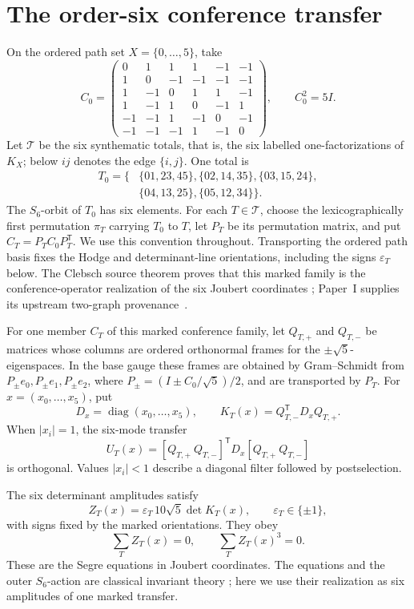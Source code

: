 \documentclass[11pt]{article}
\theoremstyle{remark}
\begin{document}
\section{The order-six conference transfer}

On the ordered path set \(X=\{0,\ldots,5\}\), take
\[
C_0=\begin{pmatrix}
0&1&1&1&-1&-1\\
1&0&-1&-1&-1&-1\\
1&-1&0&1&1&-1\\
1&-1&1&0&-1&1\\
-1&-1&1&-1&0&-1\\
-1&-1&-1&1&-1&0
\end{pmatrix},\qquad C_0^2=5I.
\]
Let \(\mathcal T\) be the six synthematic totals, that is, the six labelled
one-factorizations of \(K_X\); below \(ij\) denotes the edge \(\{i,j\}\).
One total is
\[
\begin{split}
T_0=\{&
\{01,23,45\},\{02,14,35\},\{03,15,24\},\\
&\{04,13,25\},\{05,12,34\}\}.
\end{split}
\]
The \(S_6\)-orbit of \(T_0\) has six elements.  For each
\(T\in\mathcal T\), choose the lexicographically first permutation
\(\pi_T\) carrying \(T_0\) to \(T\), let \(P_T\) be its permutation matrix,
and put \(C_T=P_TC_0P_T^{\mathsf T}\).  We use this convention throughout.
Transporting the ordered path basis fixes the Hodge and
determinant-line orientations, including the signs \(\varepsilon_T\) below.
The Clebsch source theorem proves that this marked family is the
conference-operator realization of the six Joubert coordinates
\cite[Theorem~5.1]{ClebschIII}; Paper~I supplies its upstream
two-graph provenance~\cite{ClebschI}.

For one member \(C_T\) of this marked conference family, let
\(Q_{T,+}\) and \(Q_{T,-}\) be matrices whose columns are ordered orthonormal
frames for the \(\pm\sqrt5\)-eigenspaces.  In the base gauge these frames are
obtained by Gram--Schmidt from
\(P_{\pm}e_0,P_{\pm}e_1,P_{\pm}e_2\), where
\(P_\pm=(I\pm C_0/\sqrt5)/2\), and are transported by \(P_T\).  For
\(x=(x_0,\ldots,x_5)\), put
\[
 D_x=\operatorname{diag}(x_0,\ldots,x_5),\qquad
 K_T(x)=Q_{T,-}^{\mathsf T}D_xQ_{T,+}.
\]
When \(|x_i|=1\), the six-mode transfer
\[
 U_T(x)=
 [Q_{T,+}\ Q_{T,-}]^{\mathsf T}D_x[Q_{T,+}\ Q_{T,-}]
\]
is orthogonal.  Values \(|x_i|<1\) describe a diagonal filter followed by
postselection.

The six determinant amplitudes satisfy
\begin{equation}
\label{eq:conference-amplitude}
 Z_T(x)=\varepsilon_T\,10\sqrt5\det K_T(x),
 \qquad \varepsilon_T\in\{\pm1\},
\end{equation}
with signs fixed by the marked orientations.  They obey
\begin{equation}
\label{eq:segre-nulls}
 \sum_T Z_T(x)=0,\qquad \sum_T Z_T(x)^3=0.
\end{equation}
These are the Segre equations in Joubert coordinates.  The equations and the
outer \(S_6\)-action are classical invariant theory
\cite{HowardMillsonSnowdenVakil}; here we use their realization as six
amplitudes of one marked transfer.
\end{document}
